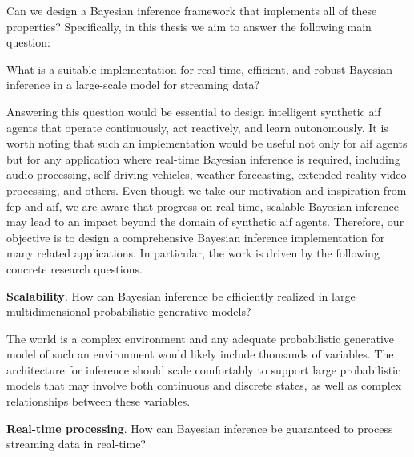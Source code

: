 Can we design a Bayesian inference framework that implements all of these properties? Specifically, in this thesis we aim to answer the following main question:

\newcommand{\mainquestion}{What is a suitable
  implementation for real-time, efficient, and robust Bayesian inference in a large-scale model for streaming data?
}

\begin{rqbox}
  \mainquestion
\end{rqbox}

Answering this question would be essential to design intelligent synthetic \ac{aif} agents that operate
continuously, act reactively, and learn autonomously.
It is worth noting that such an implementation would be useful not only for \ac{aif} agents but for
any application where real-time Bayesian inference is required, including audio processing,
self-driving vehicles, weather forecasting, extended reality video processing, and others.
Even though we take our motivation and inspiration from \ac{fep} and \ac{aif}, we are aware that progress on real-time, scalable  Bayesian inference may lead to an impact beyond the domain of synthetic \ac{aif} agents.
Therefore, our objective is to design a comprehensive Bayesian inference implementation for many related applications.
In particular, the work is driven by the following concrete research questions.

\newcommand{\scalabilityquestion}{
  How can Bayesian inference be efficiently realized in large multidimensional probabilistic
  generative models?
}

\begin{questions}
  \item \textbf{Scalability}. \scalabilityquestion
  \label{question:scalability}
\end{questions}

The world is a complex environment and any adequate probabilistic generative model of such an
environment would likely include thousands of variables.
The architecture for inference should scale comfortably to support large probabilistic models
that may involve both continuous and discrete states, as well as complex relationships between
these variables.

\newcommand{\reactivityquestion}{
  How can Bayesian inference be guaranteed to process streaming data in real-time?
}

\begin{questions}[resume] 
  \item \textbf{Real-time processing}. \reactivityquestion
  \label{question:reactivity}
\end{questions}

